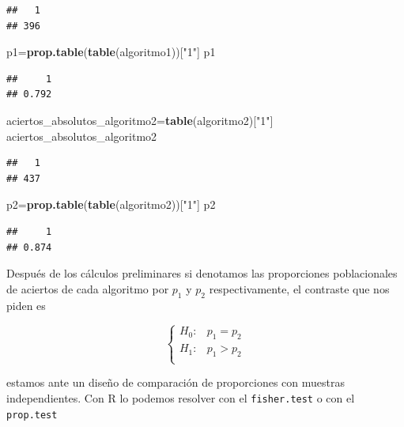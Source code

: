 \documentclass[
]{article}
\newenvironment{Shaded}{\begin{snugshade}}{\end{snugshade}}
\newcommand{\KeywordTok}[1]{\textcolor[rgb]{0.13,0.29,0.53}{\textbf{#1}}}
\newcommand{\NormalTok}[1]{#1}
\newcommand{\StringTok}[1]{\textcolor[rgb]{0.31,0.60,0.02}{#1}}
\begin{document}
\begin{verbatim}
##   1 
## 396
\end{verbatim}

\begin{Shaded}
\begin{Highlighting}[]
\NormalTok{p1=}\KeywordTok{prop.table}\NormalTok{(}\KeywordTok{table}\NormalTok{(algoritmo1))[}\StringTok{"1"}\NormalTok{]}
\NormalTok{p1}
\end{Highlighting}
\end{Shaded}

\begin{verbatim}
##     1 
## 0.792
\end{verbatim}

\begin{Shaded}
\begin{Highlighting}[]
\NormalTok{aciertos\_absolutos\_algoritmo2=}\KeywordTok{table}\NormalTok{(algoritmo2)[}\StringTok{"1"}\NormalTok{]}
\NormalTok{aciertos\_absolutos\_algoritmo2}
\end{Highlighting}
\end{Shaded}

\begin{verbatim}
##   1 
## 437
\end{verbatim}

\begin{Shaded}
\begin{Highlighting}[]
\NormalTok{p2=}\KeywordTok{prop.table}\NormalTok{(}\KeywordTok{table}\NormalTok{(algoritmo2))[}\StringTok{"1"}\NormalTok{]}
\NormalTok{p2}
\end{Highlighting}
\end{Shaded}

\begin{verbatim}
##     1 
## 0.874
\end{verbatim}

Después de los cálculos preliminares si denotamos las proporciones
poblacionales de aciertos de cada algoritmo por \(p_1\) y \(p_2\)
respectivamente, el contraste que nos piden es

\[
\left\{
\begin{array}{ll}
H_0: & p_1=p_2\\
H_1: & p_1>p_2\\
\end{array}
\right.
\]

estamos ante un diseño de comparación de proporciones con muestras
independientes. Con R lo podemos resolver con el \texttt{fisher.test} o
con el \texttt{prop.test}
\end{document}
